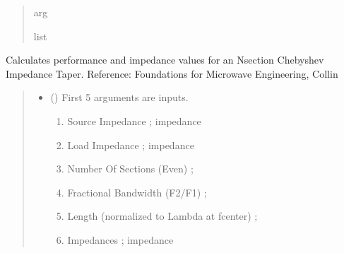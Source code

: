 \documentclass[letterpaper,10pt,english]{sphinxmanual}
\begin{document}
\begin{fulllineitems}
\begin{quote}
\begin{description}
\begin{itemize}
\end{itemize}

\sphinxAtStartPar
arg

\sphinxAtStartPar
list

\end{description}\end{quote}

\end{fulllineitems}


\begin{fulllineitems}
\label{\detokenize{components:components.Chebyshev_Taper_Impedance_Transformer}}
\pysigstartsignatures
{}
\pysigstopsignatures
\sphinxAtStartPar
Calculates performance and impedance values for an N\sphinxhyphen{}section Chebyshev Impedance Taper.
Reference:  Foundations for Microwave Engineering, Collin
\begin{quote}\begin{description}
\begin{itemize}
\item {}
\sphinxAtStartPar
{} () \textendash{}
\sphinxAtStartPar
First 5 arguments are inputs.
\begin{enumerate}
%
\item {}
\sphinxAtStartPar
Source Impedance ; impedance

\item {}
\sphinxAtStartPar
Load Impedance ; impedance

\item {}
\sphinxAtStartPar
Number Of Sections (Even) ;

\item {}
\sphinxAtStartPar
Fractional Bandwidth (F2/F1) ;

\item {}
\sphinxAtStartPar
Length (normalized to Lambda at fcenter) ;

\item {}
\sphinxAtStartPar
Impedances ; impedance


\end{enumerate}
\end{itemize}
\end{description}
\end{quote}
\end{fulllineitems}
\end{document}
